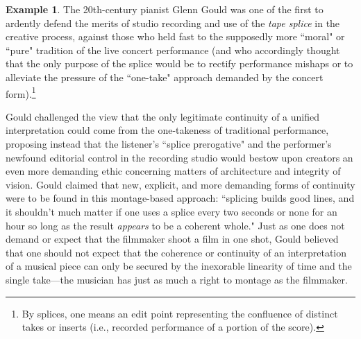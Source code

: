\documentclass[11pt]{book}
\theoremstyle{definition}
\newtheorem{example}{Example}[section]
\theoremstyle{definition}
\theoremstyle{definition}
\theoremstyle{theorem}
\theoremstyle{definition}
\begin{document}
\begin{example}
	The 20th-century pianist Glenn Gould was one of the first to ardently defend the merits of studio recording and use of the \textit{tape splice} in the creative process, against those who held fast to the supposedly more ``moral" or ``pure" tradition of the live concert performance (and who accordingly thought that the only purpose of the splice would be to rectify performance mishaps or to alleviate the pressure of the ``one-take" approach demanded by the concert form).\footnote{By splices, one means an edit point representing the confluence of distinct takes or inserts (i.e., recorded performance of a portion of the score).} \par 
	Gould challenged the view that the only legitimate continuity of a unified interpretation could come from the one-takeness of traditional performance, proposing instead that the listener's ``splice prerogative" and the performer's newfound editorial control in the recording studio would bestow upon creators an even more demanding ethic concerning matters of architecture and integrity of vision. Gould claimed that new, explicit, and more demanding forms of continuity were to be found in this montage-based approach: ``splicing builds good lines, and it shouldn't much matter if one uses a splice every two seconds or none for an hour so long as the result \textit{appears} to be a coherent whole." Just as one does not demand or expect that the filmmaker shoot a film in one shot, Gould believed that one should not expect that the coherence or continuity of an interpretation of a musical piece can only be secured by the inexorable linearity of time and the single take---the musician has just as much a right to montage as the filmmaker.  \par 

\end{example}
\end{document}
